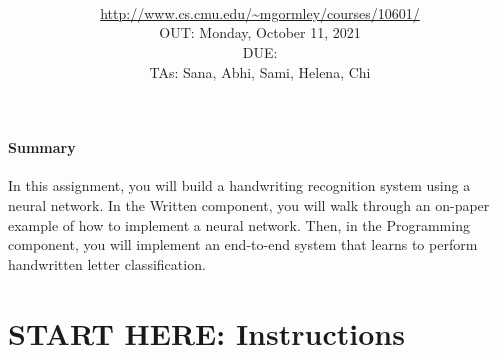 \documentclass[11pt,addpoints,answers]{exam}
\title{\textsc{\hwName}
} %
\author{\courseName\\
\url{http://www.cs.cmu.edu/~mgormley/courses/10601/} \\
OUT: Monday, October 11, 2021 \\
DUE: \dueDate{} \\ 
TAs: Sana, Abhi, Sami, Helena, Chi
}
\date{}
\date{}
\begin{document}
\maketitle

\begin{notebox}
\paragraph{Summary} In this assignment, you will build a handwriting recognition system using a neural network. In the Written component, you will walk through an on-paper example of how to implement a neural network. Then, in the Programming component, you will implement an end-to-end system that learns to perform handwritten letter classification.
\end{notebox}
\section*{START HERE: Instructions}
\end{document}
